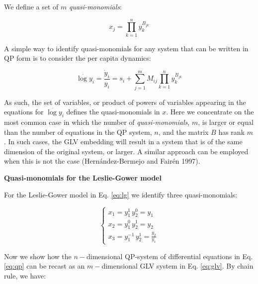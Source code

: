 \documentclass{article}
\begin{document}
\label{sec:qptoglv}

We define a set of \(m\) \emph{quasi-monomials}:

\begin{equation}
\label{eq:quasimono}
x_j = \prod_{k=1}^n y_k^{B_{jk}}
\end{equation}

A simple way to identify quasi-monomials for any system that can be
written in QP form is to consider the per capita dynamics:

\begin{equation}
\dot{\log y}_i = \frac{\dot{y}_i}{y_i} = s_i + \sum_{j = 1}^m M_{ij} \prod_{k = 1}^n y_k^{B_{jk}}
\end{equation}

As such, the set of variables, or product of powers of variables
appearing in the equations for \(\dot{\log y}_i\) defines the
quasi-monomials in \(x\). Here we concentrate on the most common case in
which the number of \emph{quasi-monomials}, \(m\), is larger or equal
than the number of equations in the QP system, \(n\), and the matrix
\(B\) has rank \(m\). In such cases, the GLV embedding will result in a
system that is of the same dimension of the original system, or larger.
A similar approach can be employed when this is not the case
(Hernández-Bermejo and Fairén 1997).

\begin{cb}
\textbf{Quasi-monomials for the Leslie-Gower model}

For the Leslie-Gower model in Eq. \ref{eq:lg} we identify three quasi-monomials:

\begin{equation}
\label{eq:lgqm}
\begin{cases}
x_1 = y_1^1 \, y_2^0 = y_1\\
x_2 = y_1^0 \, y_2^1 = y_2\\
x_3 = y_1^{-1} \, y_2^1 = \frac{y_2}{y_1}
\end{cases}
\end{equation}

\end{cb}

Now we show how the \(n-\)dimensional QP-system of differential
equations in Eq. \ref{eq:qp} can be recast as an \(m-\)dimensional GLV
system in Eq. \ref{eq:glv}. By chain rule, we have:
\end{document}

